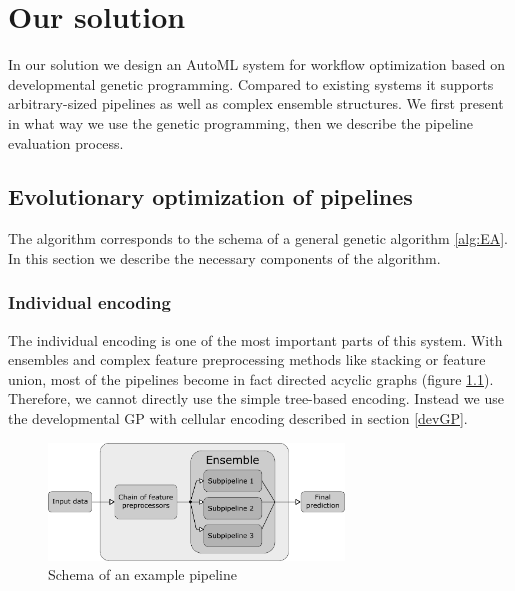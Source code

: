 \chapter{Our solution} \label{our:solution}






In our solution we design an AutoML system for workflow optimization based on
developmental genetic programming. Compared to existing systems it supports 
arbitrary-sized pipelines as well as complex ensemble structures. We first
present in what way we use the genetic programming, then we describe the
pipeline evaluation process.

\section{Evolutionary optimization of pipelines}
The algorithm corresponds to the schema of a general genetic algorithm
\ref{alg:EA}. In this section we describe the necessary components of the
algorithm.

\subsection{Individual encoding}
The individual encoding is one of the most important parts of this system. With
ensembles and complex feature preprocessing methods like stacking or feature
union, most of the pipelines become in fact directed acyclic graphs (figure 
\ref{pic02:pipeline}). Therefore, we cannot directly use the simple tree-based
encoding. Instead we use the developmental GP with cellular encoding described
in section \ref{devGP}.
\begin{figure}[ht]\centering
\includegraphics[width=0.7\textwidth]{../img/pipeline-pdfa.pdf}
\caption{Schema of an example pipeline}
\label{pic02:pipeline}
\end{figure}

